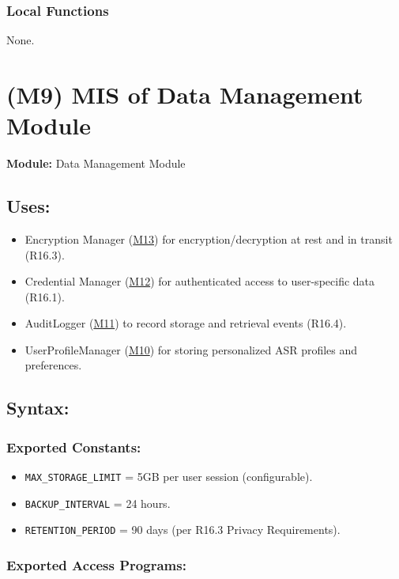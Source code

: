 \documentclass[12pt, titlepage]{article}
\begin{document}
\subsubsection{Local Functions}
None.

\section{(M9) MIS of Data Management Module}\label{M9}

\textbf{Module:} Data Management Module 

\subsection{Uses:}
\begin{itemize}
  \item Encryption Manager (\hyperref[M13]{M13}) for encryption/decryption at rest and in transit (R16.3).
  \item Credential Manager (\hyperref[M12]{M12}) for authenticated access to user-specific data (R16.1).
  \item AuditLogger (\hyperref[M11]{M11}) to record storage and retrieval events (R16.4).
  \item UserProfileManager (\hyperref[M10]{M10}) for storing personalized ASR profiles and preferences.
\end{itemize}

\subsection{Syntax:}

\subsubsection{Exported Constants:}
\begin{itemize}
  \item \texttt{MAX\_STORAGE\_LIMIT} = 5GB per user session (configurable).
  \item \texttt{BACKUP\_INTERVAL} = 24 hours.
  \item \texttt{RETENTION\_PERIOD} = 90 days (per R16.3 Privacy Requirements).
\end{itemize}

\subsubsection{Exported Access Programs:}
\end{document}
